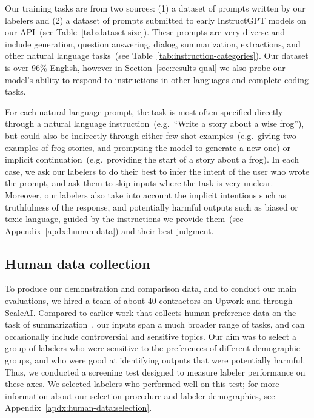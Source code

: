 Our training tasks are from two sources: (1) a dataset of prompts written by our labelers and (2) a dataset of prompts submitted to early InstructGPT models on our API~(see Table~\ref{tab:dataset-size}). These prompts are very diverse and include generation, question answering, dialog, summarization, extractions, and other natural language tasks~(see Table~\ref{tab:instruction-categories}). Our dataset is over 96\% English, however in Section~\ref{sec:results-qual} we also probe our model's ability to respond to instructions in other languages and complete coding tasks.

For each natural language prompt, the task is most often specified directly through a natural language instruction~(e.g.\ ``Write a story about a wise frog''), but could also be indirectly through either few-shot examples~(e.g.\ giving two examples of frog stories, and prompting the model to generate a new one) or implicit continuation~(e.g.\ providing the start of a story about a frog). In each case, we ask our labelers to do their best to infer the intent of the user who wrote the prompt, and ask them to skip inputs where the task is very unclear. Moreover, our labelers also take into account the implicit intentions such as truthfulness of the response, and potentially harmful outputs such as biased or toxic language, guided by the instructions we provide them~(see Appendix~\ref{apdx:human-data}) and their best judgment.


\subsection{Human data collection}
\label{sec:human-data}

To produce our demonstration and comparison data, and to conduct our main evaluations, we hired a team of about 40 contractors on Upwork and through ScaleAI. Compared to earlier work that collects human preference data on the task of summarization~\citep{ziegler2019fine,stiennon2020learning,wu2021recursively}, our inputs span a much broader range of tasks, and can occasionally include controversial and sensitive topics. Our aim was to select a group of labelers who were sensitive to the preferences of different demographic groups, and who were good at identifying outputs that were potentially harmful. Thus, we conducted a screening test designed to measure labeler performance on these axes. We selected labelers who performed well on this test; for more information about our selection procedure and labeler demographics, see Appendix~\ref{apdx:human-data:selection}. 

